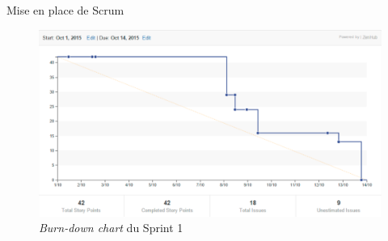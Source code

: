 \begin{frame}{Mise en place de Scrum}
	
\begin{figure}
\centering
\includegraphics[width=0.95\linewidth]{"images/Results/methodo/burndown"}
\caption{\textit{Burn-down chart} du Sprint 1}
\label{fig:burndown}
\end{figure}

\end{frame}

\ZacSpeak

